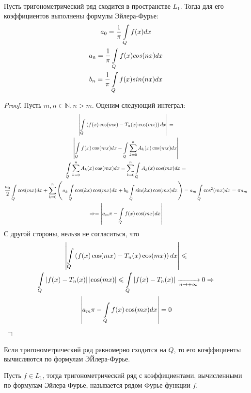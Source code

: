 \begin{theorem}
	Пусть тригонометрический ряд сходится в пространстве $L_1$.
	Тогда для его коэффициентов выполнены формулы Эйлера-Фурье:
	\begin{gather*}
		a_0 = \frac{1}{\pi}\int\limits_{Q}f(x)dx \\
		a_n = \frac{1}{\pi}\int\limits_{Q}f(x)cos(nx)dx \\
		b_n = \frac{1}{\pi}\int\limits_{Q}f(x)sin(nx)dx
	\end{gather*}
\end{theorem}

\begin{proof}
	Пусть $m, n \in \mathbb{N}, n > m$.
	Оценим следующий интеграл:
	\begin{gather*}
		\left|\int\limits_{Q}\left( f(x)\cos(mx) - T_n(x)\cos(mx)\right)dx\right| = \\
		\left|\int\limits_{Q}f(x)\cos(mx)dx - \int\limits_{Q}\sum\limits_{k = 0}^{n}A_k(x)\cos(mx)dx\right|\\
		\int\limits_{Q}\sum\limits_{k = 0}^{n}A_k(x)\cos(mx)dx = \sum\limits_{k = 0}^{n}\int\limits_{Q}A_k(x)\cos(mx) dx =\\
		\frac{a_0}{2}\int\limits_{Q}\cos(mx)dx + \sum\limits_{k = 0}^{n}\left(a_k\int\limits_{Q}\cos(kx)\cos(mx)dx +
		b_k\int\limits_{Q}\sin(kx)\cos(mx)dx\right) = a_m \int\limits_{Q}\cos^2(mx)dx = \pi a_m \\
		\Rightarrow = \left|a_m \pi - \int\limits_{Q} f(x) \cos(mx) dx\right|
	\end{gather*}
	С другой стороны, нельзя не согласиться, что 
	\begin{gather*}
		\left|\int\limits_{Q}\left( f(x)\cos(mx) - T_n(x)\cos(mx)\right)dx\right| \leqslant \\
		\int\limits_{Q}\left|f(x) - T_n(x)\right| \left|\cos(mx)\right| \leqslant \int\limits_{Q}\left|f(x) - T_n(x)\right| 
		\xrightarrow[n \rightarrow +\infty]{} 0 \Rightarrow \\
		\left|a_m \pi - \int\limits_{Q} f(x) \cos(mx) dx\right| = 0
	\end{gather*}
\end{proof}

\begin{corollary}
	Если тригонометрический ряд равномерно сходится на $Q$, 
	то его коэффициенты вычисляются по формулам ЭЙлера-Фурье.
\end{corollary}

\begin{definition}
	Пусть $f \in L_1$, тогда тригонометрический ряд с коэффициентами, 
	вычисленными по формулам Эйлера-Фурье, называется рядом Фурье функции $f$. 
\end{definition}


